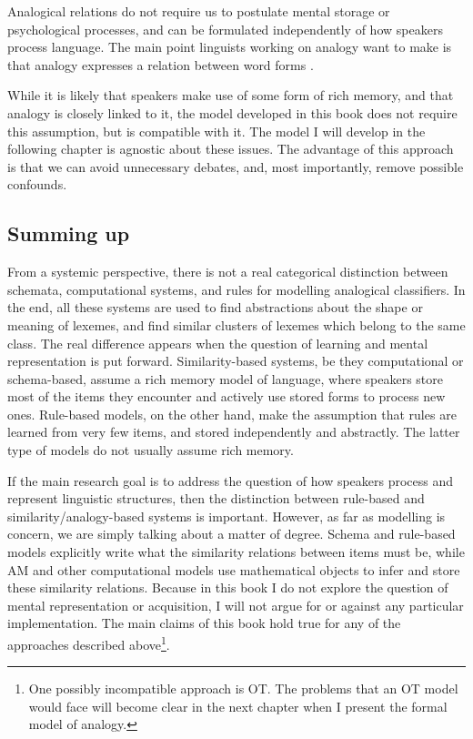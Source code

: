 Analogical relations do not require us to postulate mental storage or psychological processes, and can be formulated independently of how speakers process language. The main point linguists working on analogy want to make is that analogy expresses a relation between word forms \autocite[p. 11]{Becker.1990}.

While it is likely that speakers make use of some form of rich memory, and that analogy is closely linked to it, the model developed in this book does not require this assumption, but is compatible with it. The model I will develop in the following chapter is agnostic about these issues. The advantage of this approach is that we can avoid unnecessary debates, and, most importantly, remove possible confounds.

\subsection{Summing up}

From a systemic perspective, there is not a real categorical distinction between schemata, computational systems, and rules for modelling analogical classifiers. In the end, all these systems are used to find abstractions about the shape or meaning of lexemes, and find similar clusters of lexemes which belong to the same class. The real difference appears when the question of learning and mental representation is put forward. Similarity-based systems, be they computational or schema-based, assume a rich memory model of language, where speakers store most of the items they encounter and actively use stored forms to process new ones. Rule-based models, on the other hand, make the assumption that rules are learned from very few items, and stored independently and abstractly. The latter type of models do not usually assume rich memory.

If the main research goal is to address the question of how speakers process and represent linguistic structures, then the distinction between rule-based and similarity/analogy-based systems is important. However, as far as modelling is concern, we are simply talking about a matter of degree. Schema and rule-based  models explicitly write what the similarity relations between items must be, while AM and other computational models use mathematical objects to infer and store these similarity relations. Because in this book I do not explore the question of mental representation or acquisition, I will not argue for or against any particular implementation. The main claims of this book hold true for any of the approaches described above\footnote{One possibly incompatible approach is OT. The problems that an OT model would face will become clear in the next chapter when I present the formal model of analogy.}.

